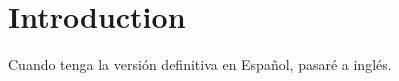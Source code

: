 \chapter{Introduction} %
\label{chap:introduction}
Cuando tenga la versión definitiva en Español, pasaré a inglés. 